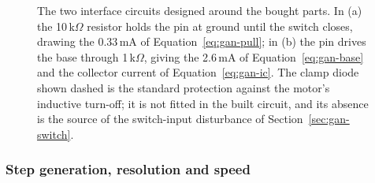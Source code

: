 \begin{figure}[!htbp]
{}
\caption{The two interface circuits designed around the bought parts. In (a) the 10\,k$\Omega$ resistor holds the pin at ground until the switch closes, drawing the 0.33\,mA of Equation~\ref{eq:gan-pull}; in (b) the pin drives the base through 1\,k$\Omega$, giving the 2.6\,mA of Equation~\ref{eq:gan-base} and the collector current of Equation~\ref{eq:gan-ic}. The clamp diode shown dashed is the standard protection against the motor's inductive turn-off; it is not fitted in the built circuit, and its absence is the source of the switch-input disturbance of Section~\ref{sec:gan-switch}.}
\label{fig:gan-switch-ckt}
\label{fig:gan-pen-ckt}
\end{figure}

\subsubsection{Step generation, resolution and speed}
\label{sec:gan-res}

